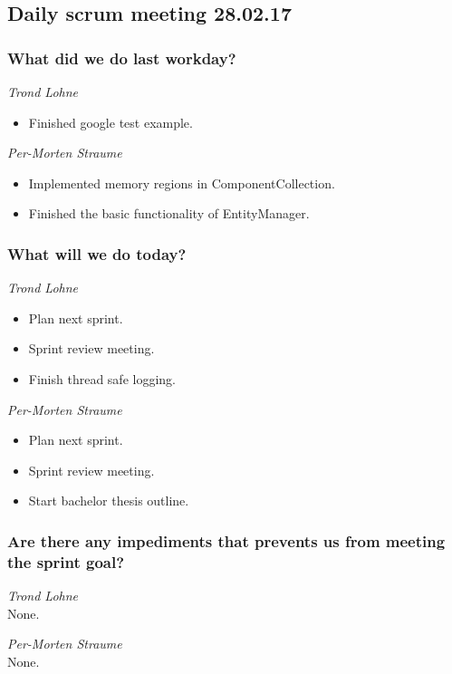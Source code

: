 \documentclass{article}
\begin{document}
\begin{center}
\subsection*{Daily scrum meeting 28.02.17}
\end{center}
\bigskip


\subsubsection*{What did we do last workday?}

\noindent\textit{Trond Lohne}
\begin{itemize}
	\item 
	Finished google test example.
\end{itemize}

\medskip

\noindent\textit{Per-Morten Straume}
\begin{itemize}
	\item 
	Implemented memory regions in ComponentCollection.
	
	\item 
	Finished the basic functionality of EntityManager.
\end{itemize}


\subsubsection*{What will we do today?}

\noindent\textit{Trond Lohne}
\begin{itemize}
	\item 
	Plan next sprint.
	
	\item 
	Sprint review meeting.
	
	\item 
	Finish thread safe logging.
\end{itemize}

\medskip

\noindent\textit{Per-Morten Straume}
\begin{itemize}
	\item 
	Plan next sprint.
	
	\item 
	Sprint review meeting.
	
	\item 
	Start bachelor thesis outline.
\end{itemize}


\subsubsection*{Are there any impediments that prevents us from meeting the sprint goal?}

\noindent\textit{Trond Lohne}\\
None.

\medskip

\noindent\textit{Per-Morten Straume}\\
None.
\end{document}
